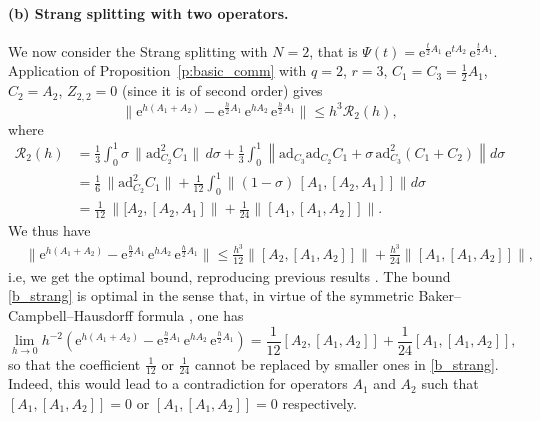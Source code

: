 \documentclass[11pt]{article}
\newcommand{\e}{\ensuremath{\mathrm{e}}}
\newcommand{\ad}{\ensuremath{\mathrm{ad}}}
\begin{document}
   \paragraph{(b) Strang splitting with two operators.}
We now consider the Strang splitting with $N=2$, that is $\Psi(t) = \e^{\frac{t}{2} A_1} \, \e^{t A_2} \, \e^{\frac{t}{2} A_1}$.
Application of Proposition~\ref{p:basic_comm} with $q=2$, $r=3$, $C_1=C_3= \frac12 A_1$, $C_2=A_2$, $Z_{2,2}=0$ (since it is of second order) gives
\begin{equation*} 
  \|\e^{h (A_1 + A_2)} - \e^{\frac{h}{2} A_1} \, \e^{h A_2} \, \e^{\frac{h}{2} A_1}\|  \leq  h^3 \mathcal{R}_2(h),
\end{equation*}  
where
\[
\begin{aligned}
\mathcal{R}_2(h) &= \frac13 \int_0^1 \sigma  \, \|\ad_{C_2}^2 C_1\| \, d\sigma + \frac{1}{3} \int_0^1
\left\| \ad_{C_3} \ad_{C_2} C_1 + 
\sigma \, \ad_{C_3}^2 (C_1 + C_2) \right\|
d\sigma \\
&= \frac{1}{6} \, \|\ad_{C_2}^2 C_1\| +  \frac{1}{12} \int_0^1 \left\| (1-\sigma) \,  [A_1, [A_2,A_1]] \right\| d\sigma \\
&= \frac{1}{12} \, \|[A_2,[A_2, A_1]\| +  \frac{1}{24} 
\left\|
 [A_1, [A_1,A_2]]
\right\|.
\end{aligned}
\]
We thus have
\begin{equation} \label{b_strang}
\begin{aligned}
 & \|\e^{h (A_1 + A_2)} - \e^{\frac{h}{2} A_1} \, \e^{h A_2} \, \e^{\frac{h}{2} A_1}\|  \leq \frac{h^3}{12} \|[A_2,[A_1,A_2]]\| + \frac{h^3}{24} \|[A_1,[A_1,A_2]]\|,
\end{aligned} 
\end{equation}  
i.e, we get the optimal bound, reproducing previous results \cite{suzuki85dfo,childs21tot,iserles24aea}. The bound \eqref{b_strang} is
optimal in the sense that, in virtue of the symmetric Baker--Campbell--Hausdorff formula \cite{blanes25aci}, one has 
\begin{equation*}
\lim_{h\to 0} h^{-2}\left(\e^{h (A_1 + A_2)} - \e^{\frac{h}{2} A_1} \, \e^{h A_2} \, \e^{\frac{h}{2} A_1}\right) = \frac{1}{12} [A_2,[A_1,A_2]] + \frac{1}{24} [A_1,[A_1,A_2]],
\end{equation*}
so that the coefficient $\frac{1}{12}$ or $\frac{1}{24}$ cannot be replaced by smaller ones in \eqref{b_strang}. Indeed, this would lead to a contradiction for operators $A_1$ and $A_2$  such that $[A_1,[A_1,A_2]]=0$ or $[A_1,[A_1,A_2]]=0$ respectively.
\end{document}
